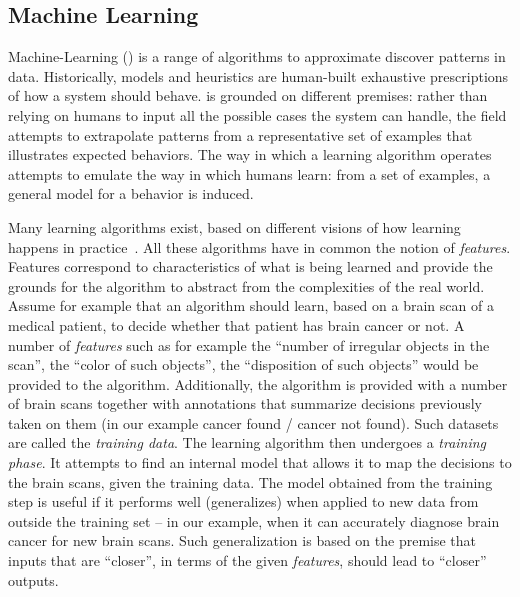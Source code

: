 \subsection{Machine Learning}

Machine-Learning (\ML) \cite{mitchell:1997} is a range of algorithms to
approximate discover patterns in data. Historically, models and heuristics are
human-built exhaustive prescriptions of how a system should behave. \ML is grounded on different premises:
rather than relying on humans to input all the possible cases the system can
handle, the field attempts to extrapolate patterns from a representative
set of examples that illustrates expected behaviors. The way in which a
learning algorithm operates attempts to emulate the way in which humans learn:
from a set of examples, a general model for a behavior is induced.

Many learning algorithms exist, based on different visions of how learning
happens in practice~\cite{Domingos:2015}. All these algorithms have in common
the notion of \emph{features}. Features correspond to characteristics of what is
being learned and provide the grounds for the algorithm to abstract from the
complexities of the real world. Assume for example that an algorithm should
learn, based on a brain scan of a medical patient, to decide whether that
patient has brain cancer or not. A number of \emph{features} such as for example
the ``number of irregular objects in the scan'', the ``color of such objects'',
the ``disposition of such objects'' would be provided to the algorithm.
Additionally, the algorithm is provided with a number of brain scans together
with annotations that summarize decisions previously taken on them (in our
example cancer found / cancer not found). Such datasets are called the
\emph{training data}.
The learning algorithm then undergoes a \emph{training phase}. It attempts to
find an internal model that allows it to map the decisions to the brain scans,
given the training data. The model obtained from the training step is useful if
it performs well (generalizes) when applied to new data from outside the training
set -- in our example, when it can accurately diagnose brain cancer for new
brain scans. Such generalization is based on the premise that inputs that are
``closer'', in terms of the given \emph{features}, should lead to ``closer''
outputs.

